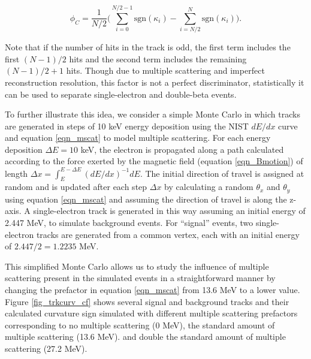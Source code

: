 \documentclass{JINST}
\begin{document}
\begin{equation}\label{eqn_assym}
\phi_{C} = \frac{1}{N/2}\Biggl(\sum_{i=0}^{N/2-1}\mathrm{sgn}(\kappa_{i}) - \sum_{i=N/2}^{N}\mathrm{sgn}(\kappa_{i})\Biggr).
\end{equation}

\noindent Note that if the number of hits in the track is odd, the first term includes the first $(N-1)/2$ hits and
the second term includes the remaining $(N-1)/2 + 1$ hits.  Though due to multiple scattering and imperfect
reconstruction resolution, this factor is not a perfect discriminator, statistically it can be used to separate 
single-electron and double-beta events.  

To further illustrate this idea, we consider a simple Monte Carlo in which tracks are generated in steps of 10 keV energy
deposition using the NIST $dE/dx$ curve and equation \ref{eqn_mscat} to model multiple scattering.  For each energy 
deposition $\Delta E = 10$ keV, the electron is propagated along a path calculated according to the force exerted
by the magnetic field (equation \ref{eqn_Bmotion}) of length $\Delta x = \int_{E}^{E-\Delta E}(dE/dx)^{-1}dE$.   The
initial direction of travel is assigned at random and is updated after each step $\Delta x$ 
by calculating a random $\theta_x$ and $\theta_y$ using equation \ref{eqn_mscat} and
assuming the direction of travel is along the z-axis.  A single-electron track is generated in this way 
assuming an initial energy of 2.447 MeV, to simulate background events.  For ``signal'' events, two 
single-electron tracks are generated from a common vertex, each with an initial energy of $2.447/2 = 1.2235$ MeV. 

This simplified Monte Carlo allows us to study the influence of multiple scattering present in the simulated events in a
straightforward manner by changing the prefactor in equation \ref{eqn_mscat} from 13.6 MeV to a lower value.  
Figure \ref{fig_trkcurv_cf} shows several signal and background tracks and their calculated curvature sign 
simulated with different multiple scattering prefactors corresponding to no multiple scattering (0 MeV), the 
standard amount of multiple scattering (13.6 MeV). and double the standard amount of multiple scattering (27.2 
MeV).  
\end{document}
